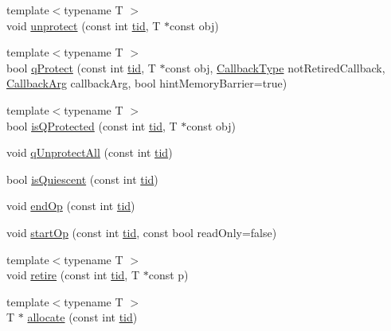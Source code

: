 \begin{DoxyCompactItemize}
\item 
{\footnotesize template$<$typename T $>$ }\\void \hyperlink{classrecord__manager_af60b539a2100efc85a22a605cf7c0ad9}{unprotect} (const int \hyperlink{microbench_2main_8cpp_a9ca9869868fe7e7a38a921cc7de4103f}{tid}, T $\ast$const obj)
\item 
{\footnotesize template$<$typename T $>$ }\\bool \hyperlink{classrecord__manager_a570af4c6a5febf579416b23a8ee72f61}{q\+Protect} (const int \hyperlink{microbench_2main_8cpp_a9ca9869868fe7e7a38a921cc7de4103f}{tid}, T $\ast$const obj, \hyperlink{globals_8h_a57f5c0d40b156d7d996492fb2f16e3cd}{Callback\+Type} not\+Retired\+Callback, \hyperlink{globals_8h_a3de64ef48066ac6430631c8b81a15345}{Callback\+Arg} callback\+Arg, bool hint\+Memory\+Barrier=true)
\item 
{\footnotesize template$<$typename T $>$ }\\bool \hyperlink{classrecord__manager_a0d27b8777d71bb1986ee822fa8db0de6}{is\+Q\+Protected} (const int \hyperlink{microbench_2main_8cpp_a9ca9869868fe7e7a38a921cc7de4103f}{tid}, T $\ast$const obj)
\item 
void \hyperlink{classrecord__manager_aed181e88c726f16799c0a6d8a1c5b852}{q\+Unprotect\+All} (const int \hyperlink{microbench_2main_8cpp_a9ca9869868fe7e7a38a921cc7de4103f}{tid})
\item 
bool \hyperlink{classrecord__manager_a70c5aa0cc460e1d8e3ed01e136fa5378}{is\+Quiescent} (const int \hyperlink{microbench_2main_8cpp_a9ca9869868fe7e7a38a921cc7de4103f}{tid})
\item 
void \hyperlink{classrecord__manager_a15c7aa67b296aa1eaa34def07d012aa1}{end\+Op} (const int \hyperlink{microbench_2main_8cpp_a9ca9869868fe7e7a38a921cc7de4103f}{tid})
\item 
void \hyperlink{classrecord__manager_a3bc2326875be2dee42eda9dc8620ee1c}{start\+Op} (const int \hyperlink{microbench_2main_8cpp_a9ca9869868fe7e7a38a921cc7de4103f}{tid}, const bool read\+Only=false)
\item 
{\footnotesize template$<$typename T $>$ }\\void \hyperlink{classrecord__manager_a630aebebde7703d3beec174beb1a3592}{retire} (const int \hyperlink{microbench_2main_8cpp_a9ca9869868fe7e7a38a921cc7de4103f}{tid}, T $\ast$const p)
\item 
{\footnotesize template$<$typename T $>$ }\\T $\ast$ \hyperlink{classrecord__manager_ae9c214a42d934bcbe4a6fc980dcdace0}{allocate} (const int \hyperlink{microbench_2main_8cpp_a9ca9869868fe7e7a38a921cc7de4103f}{tid})

\end{DoxyCompactItemize}
